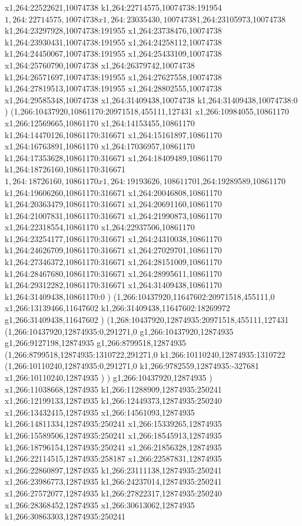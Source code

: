 {x1,264:22522621,10074738
k1,264:22714575,10074738:191954
$1,264:22714575,10074738
x1,264:23035430,10074738
$1,264:23105973,10074738
k1,264:23297928,10074738:191955
x1,264:23738476,10074738
k1,264:23930431,10074738:191955
x1,264:24258112,10074738
k1,264:24450067,10074738:191955
x1,264:25433109,10074738
x1,264:25760790,10074738
x1,264:26379742,10074738
k1,264:26571697,10074738:191955
x1,264:27627558,10074738
k1,264:27819513,10074738:191955
x1,264:28802555,10074738
x1,264:29585348,10074738
x1,264:31409438,10074738
k1,264:31409438,10074738:0
)
(1,266:10437920,10861170:20971518,455111,127431
x1,266:10984055,10861170
x1,266:12569665,10861170
x1,264:14153455,10861170
k1,264:14470126,10861170:316671
x1,264:15161897,10861170
x1,264:16763891,10861170
x1,264:17036957,10861170
k1,264:17353628,10861170:316671
x1,264:18409489,10861170
k1,264:18726160,10861170:316671
$1,264:18726160,10861170
x1,264:19193626,10861170
$1,264:19289589,10861170
k1,264:19606260,10861170:316671
x1,264:20046808,10861170
k1,264:20363479,10861170:316671
x1,264:20691160,10861170
k1,264:21007831,10861170:316671
x1,264:21990873,10861170
x1,264:22318554,10861170
x1,264:22937506,10861170
k1,264:23254177,10861170:316671
x1,264:24310038,10861170
k1,264:24626709,10861170:316671
x1,264:27029701,10861170
k1,264:27346372,10861170:316671
x1,264:28151009,10861170
k1,264:28467680,10861170:316671
x1,264:28995611,10861170
k1,264:29312282,10861170:316671
x1,264:31409438,10861170
k1,264:31409438,10861170:0
)
(1,266:10437920,11647602:20971518,455111,0
x1,266:13139466,11647602
k1,266:31409438,11647602:18269972
g1,266:31409438,11647602
)
(1,268:10437920,12874935:20971518,455111,127431
(1,266:10437920,12874935:0,291271,0
g1,266:10437920,12874935
g1,266:9127198,12874935
g1,266:8799518,12874935
(1,266:8799518,12874935:1310722,291271,0
k1,266:10110240,12874935:1310722
(1,266:10110240,12874935:0,291271,0
k1,266:9782559,12874935:-327681
x1,266:10110240,12874935
)
)
g1,266:10437920,12874935
)
x1,266:11038668,12874935
k1,266:11288909,12874935:250241
x1,266:12199133,12874935
k1,266:12449373,12874935:250240
x1,266:13432415,12874935
x1,266:14561093,12874935
k1,266:14811334,12874935:250241
x1,266:15339265,12874935
k1,266:15589506,12874935:250241
x1,266:18545913,12874935
k1,266:18796154,12874935:250241
x1,266:21856328,12874935
k1,266:22114515,12874935:258187
x1,266:22587831,12874935
x1,266:22860897,12874935
k1,266:23111138,12874935:250241
x1,266:23986773,12874935
k1,266:24237014,12874935:250241
x1,266:27572077,12874935
k1,266:27822317,12874935:250240
x1,266:28368452,12874935
x1,266:30613062,12874935
k1,266:30863303,12874935:250241
}
